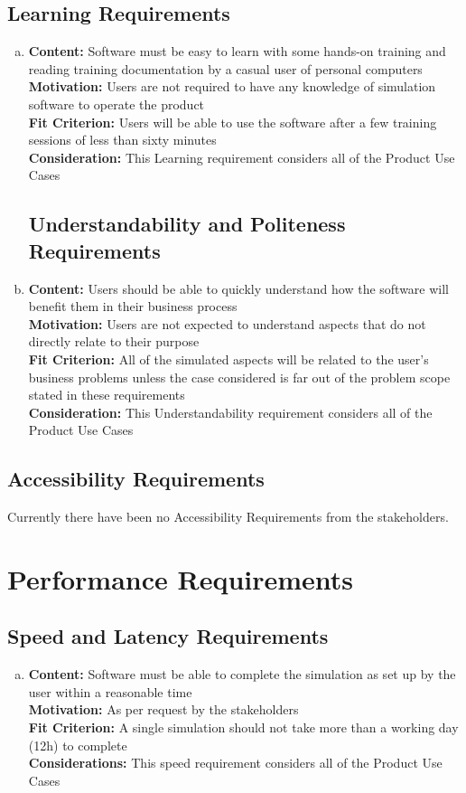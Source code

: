 \documentclass[paper=letter, fontsize=10pt]{scrartcl}
\numberwithin{equation}{section}		%
\numberwithin{figure}{section}			%
\numberwithin{table}{section}				%
\begin{document}
\subsection{Learning Requirements}
\begin{enumerate}[(a)]
	\item \textbf{Content:} Software must be easy to learn with some hands-on training and reading training documentation by a casual user of personal computers
	\\	  \textbf{Motivation:} Users are not required to have any knowledge of simulation software to operate the product
	\\	  \textbf{Fit Criterion:} Users will be able to use the software after a few training sessions of less than sixty minutes
	\\	  \textbf{Consideration:} This Learning requirement considers all of the Product Use Cases	
\subsection{Understandability and Politeness Requirements}
	\item \textbf{Content:} Users should be able to quickly understand how the software will benefit them in their business process
	\\	  \textbf{Motivation:} Users are not expected to understand aspects that do not directly relate to their purpose
	\\	  \textbf{Fit Criterion:} All of the simulated aspects will be related to the user's business problems unless the case considered is far out of the problem scope stated in these requirements
	\\	  \textbf{Consideration:} This Understandability requirement considers all of the Product Use Cases	
\end{enumerate}
\subsection{Accessibility Requirements}
Currently there have been no Accessibility Requirements from the stakeholders.

\section{Performance Requirements}
\subsection{Speed and Latency Requirements}
\begin{enumerate}[(a)]
	\item \textbf{Content:} Software must be able to complete the simulation as set up by the user within a reasonable time
	\\	  \textbf{Motivation:} As per request by the stakeholders
	\\	  \textbf{Fit Criterion:} A single simulation should not take more than a working day (12h) to complete
	\\	  \textbf{Considerations:} This speed requirement considers all of the Product Use Cases
\end{enumerate}
\end{document}
